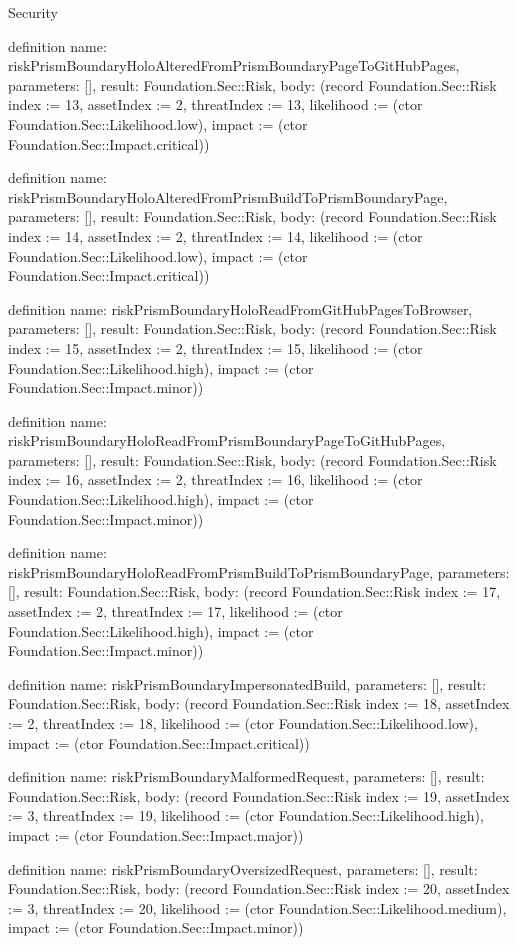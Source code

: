 \begin{lexlean}{Security}
\begin{semanticmodule}
definition{
  name: riskPrismBoundaryHoloAlteredFromPrismBoundaryPageToGitHubPages,
  parameters: [],
  result: Foundation.Sec::Risk,
  body: (record Foundation.Sec::Risk {index := 13, assetIndex := 2, threatIndex := 13, likelihood := (ctor Foundation.Sec::Likelihood.low), impact := (ctor Foundation.Sec::Impact.critical)})
}

definition{
  name: riskPrismBoundaryHoloAlteredFromPrismBuildToPrismBoundaryPage,
  parameters: [],
  result: Foundation.Sec::Risk,
  body: (record Foundation.Sec::Risk {index := 14, assetIndex := 2, threatIndex := 14, likelihood := (ctor Foundation.Sec::Likelihood.low), impact := (ctor Foundation.Sec::Impact.critical)})
}

definition{
  name: riskPrismBoundaryHoloReadFromGitHubPagesToBrowser,
  parameters: [],
  result: Foundation.Sec::Risk,
  body: (record Foundation.Sec::Risk {index := 15, assetIndex := 2, threatIndex := 15, likelihood := (ctor Foundation.Sec::Likelihood.high), impact := (ctor Foundation.Sec::Impact.minor)})
}

definition{
  name: riskPrismBoundaryHoloReadFromPrismBoundaryPageToGitHubPages,
  parameters: [],
  result: Foundation.Sec::Risk,
  body: (record Foundation.Sec::Risk {index := 16, assetIndex := 2, threatIndex := 16, likelihood := (ctor Foundation.Sec::Likelihood.high), impact := (ctor Foundation.Sec::Impact.minor)})
}

definition{
  name: riskPrismBoundaryHoloReadFromPrismBuildToPrismBoundaryPage,
  parameters: [],
  result: Foundation.Sec::Risk,
  body: (record Foundation.Sec::Risk {index := 17, assetIndex := 2, threatIndex := 17, likelihood := (ctor Foundation.Sec::Likelihood.high), impact := (ctor Foundation.Sec::Impact.minor)})
}

definition{
  name: riskPrismBoundaryImpersonatedBuild,
  parameters: [],
  result: Foundation.Sec::Risk,
  body: (record Foundation.Sec::Risk {index := 18, assetIndex := 2, threatIndex := 18, likelihood := (ctor Foundation.Sec::Likelihood.low), impact := (ctor Foundation.Sec::Impact.critical)})
}

definition{
  name: riskPrismBoundaryMalformedRequest,
  parameters: [],
  result: Foundation.Sec::Risk,
  body: (record Foundation.Sec::Risk {index := 19, assetIndex := 3, threatIndex := 19, likelihood := (ctor Foundation.Sec::Likelihood.high), impact := (ctor Foundation.Sec::Impact.major)})
}

definition{
  name: riskPrismBoundaryOversizedRequest,
  parameters: [],
  result: Foundation.Sec::Risk,
  body: (record Foundation.Sec::Risk {index := 20, assetIndex := 3, threatIndex := 20, likelihood := (ctor Foundation.Sec::Likelihood.medium), impact := (ctor Foundation.Sec::Impact.minor)})
}


\end{semanticmodule}
\end{lexlean}

